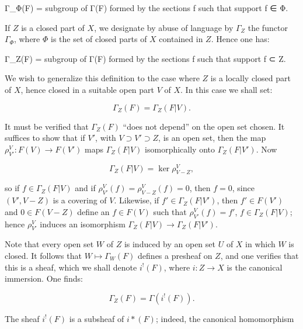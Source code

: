 \documentclass[
  11pt,
  a4paper,
]{book}
\newenvironment{Shaded}{}{}
\newcommand{\NormalTok}[1]{#1}
\begin{document}
\begin{Shaded}
\begin{Highlighting}[]
\NormalTok{Γ\_Φ(F) = subgroup of Γ(F) formed by the sections f such that support f ∈ Φ.}
\end{Highlighting}
\end{Shaded}

If \(Z\) is a closed part of \(X\), we designate by abuse of language by
\(\Gamma_{Z}\) the functor \(\Gamma_{\Phi}\), where \(\Phi\) is the set
of closed parts of \(X\) contained in \(Z\). Hence one has:

\begin{Shaded}
\begin{Highlighting}[]
\NormalTok{Γ\_Z(F) = subgroup of Γ(F) formed by the sections f such that support f ⊂ Z.}
\end{Highlighting}
\end{Shaded}

We wish to generalize this definition to the case where \(Z\) is a
locally closed part of \(X\), hence closed in a suitable open part \(V\)
of \(X\). In this case we shall set:

\[ \Gamma_{Z}(F) = \Gamma_{Z}(F|V). \]

It must be verified that \(\Gamma_{Z}(F)\) ``does not depend'' on the
open set chosen. It suffices to show that if \(V'\), with
\(V \supset V' \supset Z\), is an open set, then the map
\(\rho^{V}_{V'}: F(V) \to F(V')\) maps \(\Gamma_{Z}(F|V)\)
isomorphically onto \(\Gamma_{Z}(F|V')\). Now

\[ \Gamma_{Z}(F|V) = \ker \rho^{V}_{V-Z}, \]

so if \(f \in \Gamma_{Z}(F|V)\) and if
\(\rho^{V}_{V'}(f) = \rho^{V}_{V-Z}(f) = 0\), then \(f = 0\), since
\((V', V - Z)\) is a covering of \(V\). Likewise, if
\(f' \in \Gamma_{Z}(F|V')\), then \(f' \in F(V')\) and
\(0 \in F(V - Z)\) define an \(f \in F(V)\) such that
\(\rho^{V}_{V'}(f) = f'\), \(f \in \Gamma_{Z}(F|V)\); hence
\(\rho^{V}_{V'}\) induces an isomorphism
\(\Gamma_{Z}(F|V) \to \Gamma_{Z}(F|V')\).

Note that every open set \(W\) of \(Z\) is induced by an open set \(U\)
of \(X\) in which \(W\) is closed. It follows that \(W
\mapsto \Gamma_{W}(F)\) defines a presheaf on \(Z\), and one verifies
that this is a sheaf, which we shall denote \(i^{!}(F)\), where
\(i: Z \to X\) is the canonical immersion. One finds:

\[ \Gamma_{Z}(F) = \Gamma(i^{!}(F)). \]

The sheaf \(i^{!}(F)\) is a subsheaf of \(i*(F)\); indeed, the canonical
homomorphism
\end{document}
